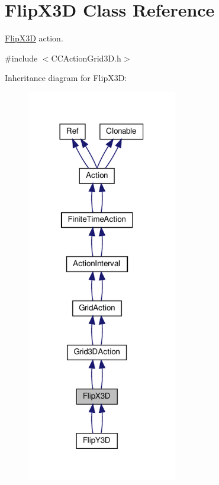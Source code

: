 \hypertarget{classFlipX3D}{}\section{Flip\+X3D Class Reference}
\label{classFlipX3D}


\hyperlink{classFlipX3D}{Flip\+X3D} action.  




{\ttfamily \#include $<$C\+C\+Action\+Grid3\+D.\+h$>$}



Inheritance diagram for Flip\+X3D\+:
\nopagebreak
\begin{figure}[H]
\begin{center}
\leavevmode
\includegraphics[width=186pt]{classFlipX3D__inherit__graph}
\end{center}
\end{figure}


